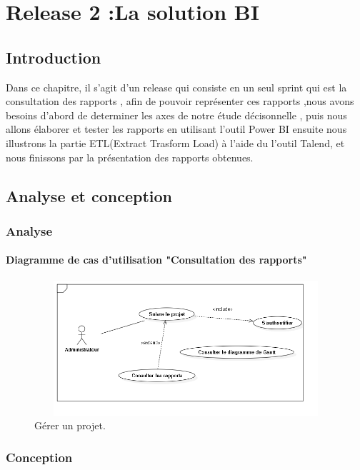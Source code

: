 \chapter{Release 2 :La solution BI }


\section{Introduction}

Dans ce chapitre, il s'agit d'un release qui consiste en un seul sprint qui est la consultation des rapports ,
afin de pouvoir repr\'{e}senter ces rapports ,nous avons besoins d'abord de determiner
les axes de notre \'{e}tude d\'{e}cisonnelle , puis nous allons \'{e}laborer et tester les rapports en utilisant l'outil Power BI
ensuite nous illustrons la partie ETL(Extract Trasform Load) \`{a} l'aide du l'outil Talend,
et nous finissons par la pr\'{e}sentation des rapports obtenues.

\section{ Analyse et conception}
\subsection{Analyse}

\subsubsection{ Diagramme de cas d'utilisation "Consultation des rapports"}
\begin{figure}[H]
\center
\includegraphics[width=12cm,height=5cm]{./figures/ucS.png}
\caption{G\'{e}rer un projet.}

\end{figure}

\subsection{Conception}

